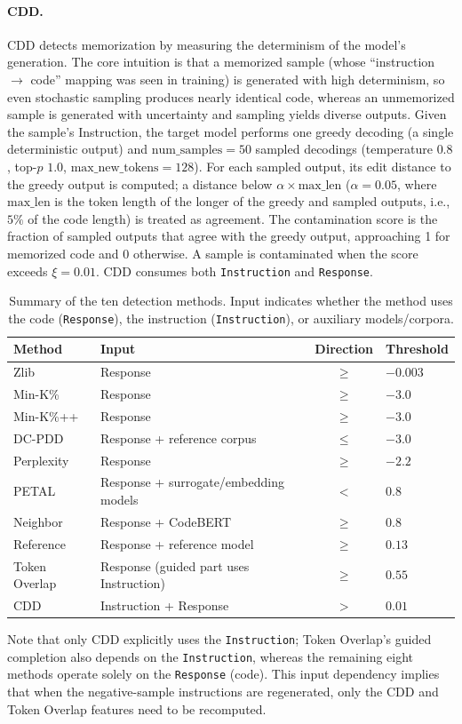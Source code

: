 \paragraph{CDD.}
CDD detects memorization by measuring the determinism of the model's generation. The core intuition is that a memorized sample (whose ``instruction $\rightarrow$ code'' mapping was seen in training) is generated with high determinism, so even stochastic sampling produces nearly identical code, whereas an unmemorized sample is generated with uncertainty and sampling yields diverse outputs. Given the sample's Instruction, the target model performs one greedy decoding (a single deterministic output) and $\mathrm{num\_samples}=50$ sampled decodings (temperature $0.8$, top-$p$ $1.0$, $\mathrm{max\_new\_tokens}=128$). For each sampled output, its edit distance to the greedy output is computed; a distance below $\alpha\times\mathrm{max\_len}$ ($\alpha=0.05$, where $\mathrm{max\_len}$ is the token length of the longer of the greedy and sampled outputs, i.e., $5\%$ of the code length) is treated as agreement. The contamination score is the fraction of sampled outputs that agree with the greedy output, approaching 1 for memorized code and 0 otherwise. A sample is contaminated when the score exceeds $\xi=0.01$. CDD consumes both \texttt{Instruction} and \texttt{Response}.

\begin{table}[t]
\centering
\caption{Summary of the ten detection methods. Input indicates whether the method uses the code (\texttt{Response}), the instruction (\texttt{Instruction}), or auxiliary models/corpora.}
\label{tab:methods}
\small
\begin{tabular}{llcl}
\toprule
Method & Input & Direction & Threshold \\
\midrule
Zlib & Response & $\ge$ & $-0.003$ \\
Min-K\% & Response & $\ge$ & $-3.0$ \\
Min-K\%++ & Response & $\ge$ & $-3.0$ \\
DC-PDD & Response + reference corpus & $\le$ & $-3.0$ \\
Perplexity & Response & $\ge$ & $-2.2$ \\
PETAL & Response + surrogate/embedding models & $<$ & $0.8$ \\
Neighbor & Response + CodeBERT & $\ge$ & $0.8$ \\
Reference & Response + reference model & $\ge$ & $0.13$ \\
Token Overlap & Response (guided part uses Instruction) & $\ge$ & $0.55$ \\
CDD & Instruction + Response & $>$ & $0.01$ \\
\bottomrule
\end{tabular}
\end{table}

Note that only CDD explicitly uses the \texttt{Instruction}; Token Overlap's guided completion also depends on the \texttt{Instruction}, whereas the remaining eight methods operate solely on the \texttt{Response} (code). This input dependency implies that when the negative-sample instructions are regenerated, only the CDD and Token Overlap features need to be recomputed.
